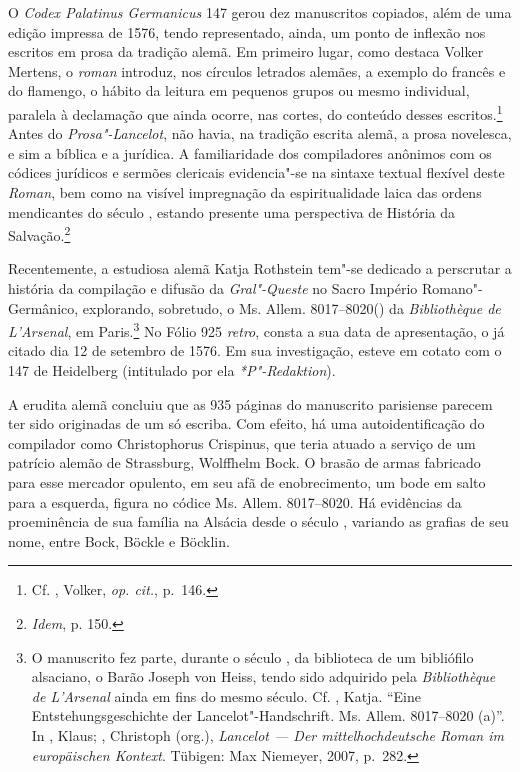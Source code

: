 O \textit{Codex Palatinus Germanicus} 147 gerou dez manuscritos copiados, além
de uma edição impressa de 1576, tendo representado, ainda, um ponto de inflexão
nos escritos em prosa da tradição alemã. Em primeiro lugar, como destaca Volker
Mertens, o \textit{roman} introduz, nos círculos letrados alemães, a exemplo do
francês e do flamengo, o hábito da leitura em pequenos grupos ou mesmo
individual, paralela à declamação que ainda ocorre, nas cortes, do conteúdo
desses escritos.\footnote{ Cf. , Volker, \textit{op. cit.}, p.~146. }
Antes do \textit{Prosa"-Lancelot}, não havia, na tradição escrita alemã, a prosa
novelesca, e sim a bíblica e a jurídica. A familiaridade dos compiladores
anônimos com os códices jurídicos e sermões clericais evidencia"-se na sintaxe
textual flexível deste \textit{Roman}, bem como na visível impregnação da
espiritualidade laica das ordens mendicantes do século , estando
presente uma perspectiva de História da Salvação.\footnote{ \textit{Idem}, p.
150. }

Recentemente, a estudiosa alemã Katja Rothstein tem"-se dedicado a perscrutar a
história da compilação e difusão da \textit{Gral"-Queste} no Sacro Império
Romano"-Germânico, explorando, sobretudo, o Ms. Allem. 8017--8020() da
\textit{Bibliothèque de L'Arsenal}, em Paris.\footnote{ O manuscrito fez parte,
durante o século , da biblioteca de um bibliófilo alsaciano, o
Barão Joseph von Heiss, tendo sido adquirido pela \textit{Bibliothèque de
L'Arsenal} ainda em fins do mesmo século. Cf. , Katja. ``Eine
Entstehungsgeschichte der Lancelot"-Handschrift. Ms. Allem.  8017--8020 (a)''. In
, Klaus; , Christoph (org.), \textit{Lancelot --- Der mittelhochdeutsche
Roman im europäischen Kontext}. Tübigen: Max Niemeyer, 2007, p.~282. } No
Fólio 925 \textit{retro}, consta a sua data de apresentação, o já citado dia 12
de setembro de 1576. Em sua investigação, esteve em cotato com o  147 de
Heidelberg (intitulado por ela \textit{*P"-Redaktion}).

A erudita alemã concluiu que as 935 páginas do manuscrito parisiense parecem ter
sido originadas de um só escriba. Com efeito, há uma autoidentificação do
compilador como Christophorus Crispinus, que teria atuado a serviço de um
patrício alemão de Strassburg, Wolffhelm Bock. O brasão de armas fabricado para
esse mercador opulento, em seu afã de enobrecimento, um bode em salto para a
esquerda, figura no códice Ms. Allem. 8017--8020. Há evidências da proeminência
de sua família na Alsácia desde o século , variando as grafias de
seu nome, entre Bock, Böckle e Böcklin.

